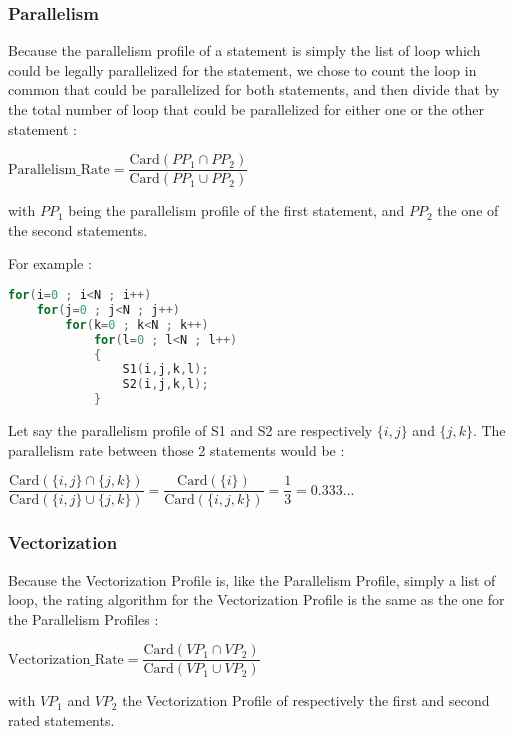 \documentclass[paper=a4, fontsize=11pt]{scrartcl}
\numberwithin{equation}{section}        %
\numberwithin{figure}{section}          %
\numberwithin{table}{section}               %
\begin{document}
        \subsubsection{Parallelism}
            Because the parallelism profile of a statement is simply the list of loop
            which could be legally parallelized for the statement, we chose to count the
            loop in common that could be parallelized for both statements, and then
            divide that by the total number of loop that could be parallelized for either one
            or the other statement :
            \begin{center}
                $ \mathrm{Parallelism\_Rate} =  \dfrac{\mathrm{Card}( {PP_1} \cap {PP_2})}{\mathrm{Card}({PP_1} \cup {PP_2})}$
            \end{center}
            with $PP_1$ being the parallelism profile of the first statement, and $PP_2$ the
            one of the second statements.

            \bigskip

            For example :
\begin{lstlisting}[frame=single, language=C, caption={Parallelism profile rating example}, label={lst:pp_example}]
for(i=0 ; i<N ; i++)
    for(j=0 ; j<N ; j++)
        for(k=0 ; k<N ; k++)
            for(l=0 ; l<N ; l++)
            {
                S1(i,j,k,l);
                S2(i,j,k,l);
            }
\end{lstlisting}
        Let say the parallelism profile of S1 and S2 are respectively $\{i,j\}$ and $\{j,k\}$.
        The parallelism rate between those 2 statements would be :
        \begin{center}
            $\dfrac{\mathrm{Card}( \{i,j\} \cap \{j,k\})}{\mathrm{Card}( \{i,j\} \cup \{j,k\})}
            = \dfrac{\mathrm{Card}( \{i\})}{\mathrm{Card}( \{i,j,k\})}
            = \dfrac{1}{3}
            = 0.333...$
        \end{center}

        \subsubsection{Vectorization}
            Because the Vectorization Profile is, like the Parallelism Profile, simply a list of loop, the rating algorithm for the Vectorization Profile is the same as the one for the Parallelism Profiles :
            \begin{center}
                $ \mathrm{Vectorization\_Rate} =  \dfrac{\mathrm{Card}( {VP_1} \cap {VP_2})}{\mathrm{Card}({VP_1} \cup {VP_2})}$
            \end{center}
            with $VP_1$ and $VP_2$ the Vectorization Profile of respectively the first and second rated statements.
\end{document}
